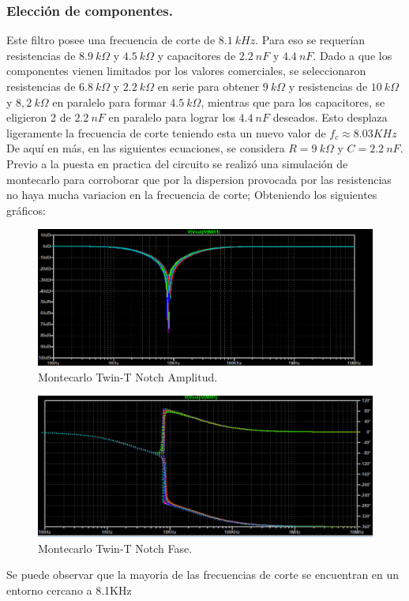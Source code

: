 \documentclass[a4paper]{article}
\begin{document}
\subsubsection{Elección de componentes.}
 Este filtro posee una frecuencia de corte de $ 8.1 \ kHz $. Para eso se requerían resistencias de $ 8.9 \ k\Omega $ y $ 4.5 \ k\Omega $ y capacitores de $ 2.2 \ nF $ y $ 4.4 \ nF $.
Dado a que los componentes vienen limitados por los valores comerciales,  se seleccionaron resistencias de $ 6.8 \ k\Omega $ y $ 2.2 \ k\Omega $ en serie para obtener  $ 9 \ k\Omega $ y  resistencias de $ 10 \ k\Omega $ y $ 8,2 \ k\Omega $ en paralelo para formar $ 4.5 \ k\Omega $, mientras que para los capacitores, se eligieron 2 de $ 2.2 \ nF $ en paralelo para lograr los $ 4.4 \ nF $ deseados. Esto desplaza ligeramente la frecuencia de corte teniendo esta un nuevo valor de $f_c \approx 8.03 KHz$
De aquí en más, en las siguientes ecuaciones, se considera $ R = 9 \ k\Omega $ y $ C = 2.2 \ nF $.
Previo a la puesta en practica del circuito se realizó una simulación de montecarlo para corroborar que por la dispersion provocada por las resistencias no haya mucha variacion en la frecuencia de corte; Obteniendo los siguientes gráficos:
\begin{figure}[H]
	\centering
	\includegraphics[width=\textwidth ]{Montecarlo.PNG}
\caption{Montecarlo Twin-T Notch Amplitud.}
	\label{fig:Montecarlo}
\end{figure}
\begin{figure}[H]
	\centering
	\includegraphics[width=\textwidth]{MontecarloPh.PNG}
\caption{Montecarlo Twin-T Notch Fase.}
	\label{fig:MontecarloFase}
\end{figure}
Se puede observar que la mayoria de las frecuencias de corte se encuentran en un entorno cercano a 8.1KHz
\end{document}
